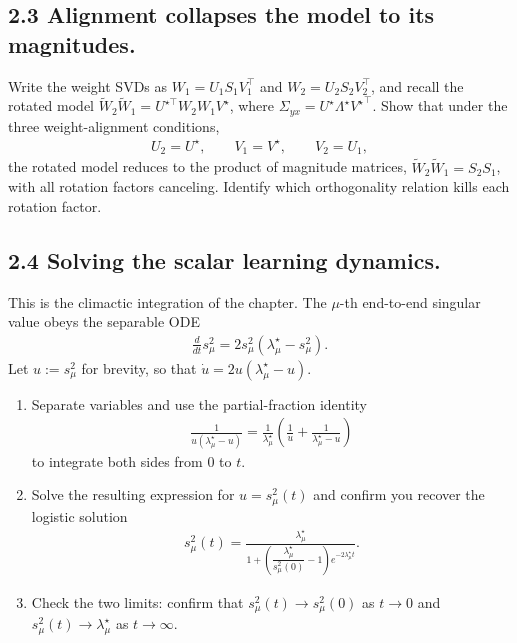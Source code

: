 \subsection*{2.3 Alignment collapses the model to its magnitudes.}
Write the weight SVDs as $W_1 = U_1 S_1 V_1^\top$ and $W_2 = U_2 S_2 V_2^\top$, and
recall the rotated model $\tilde{W}_2 \tilde{W}_1 = U^{\star\top} W_2 W_1 V^\star$,
where $\Sigma_{yx} = U^\star \Lambda^\star {V^\star}^\top$. Show that under the
three weight-alignment conditions,
\begin{align*}
    U_2 = U^\star, \qquad V_1 = V^\star, \qquad V_2 = U_1,
\end{align*}
the rotated model reduces to the product of magnitude matrices,
$\tilde{W}_2 \tilde{W}_1 = S_2 S_1$, with all rotation factors canceling. Identify
which orthogonality relation kills each rotation factor.

\subsection*{2.4 Solving the scalar learning dynamics.}
This is the climactic integration of the chapter. The $\mu$-th end-to-end singular
value obeys the separable ODE
\begin{align*}
    \frac{d}{dt}s_\mu^2 = 2 s_\mu^2 (\lambda^\star_\mu - s_\mu^2).
\end{align*}
Let $u := s_\mu^2$ for brevity, so that $\dot{u} = 2u(\lambda^\star_\mu - u)$.
\begin{enumerate}[label=(\alph*)]
    \item Separate variables and use the partial-fraction identity
    \begin{align*}
        \frac{1}{u(\lambda^\star_\mu - u)}
        = \frac{1}{\lambda^\star_\mu}\left(\frac{1}{u} + \frac{1}{\lambda^\star_\mu - u}\right)
    \end{align*}
    to integrate both sides from $0$ to $t$.
    \item Solve the resulting expression for $u = s_\mu^2(t)$ and confirm you
    recover the logistic solution
    \begin{align*}
        s^2_\mu(t) = \frac{\lambda^\star_\mu}
        {1 + \left(\dfrac{\lambda^\star_\mu}{s^2_\mu(0)} - 1\right) e^{-2 \lambda^\star_\mu t}}.
    \end{align*}
    \item Check the two limits: confirm that $s_\mu^2(t) \to s_\mu^2(0)$ as
    $t \to 0$ and $s_\mu^2(t) \to \lambda^\star_\mu$ as $t \to \infty$.
\end{enumerate}

